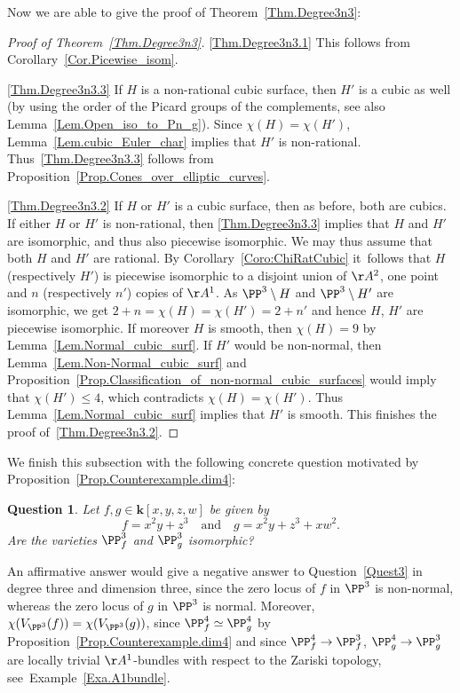 \documentclass[JEP,XML,SOM,Unicode,NoFloatCountersInSection,published]{cedram}
\newcommand\quand{\quad\text{and}\quad}
\newtheorem{question}[lemma]{Question}
\theoremstyle{definition}
\renewcommand\k{{\mathbf k}}
\begin{document}
Now we are able to give the proof of Theorem~\ref{Thm.Degree3n3}:

\skpt
\begin{proof}[Proof of Theorem~\ref{Thm.Degree3n3}]
\eqref{Thm.Degree3n3.1} This follows from Corollary~\ref{Cor.Picewise_isom}.

\eqref{Thm.Degree3n3.3} If $H$ is a non-rational cubic surface,
then $H'$ is a cubic as well (by using the order of the Picard groups
of the complements, see also Lemma~\ref{Lem.Open_iso_to_Pn_g}).
Since $\chi(H) = \chi(H')$, Lemma~\ref{Lem.cubic_Euler_char} implies that $H'$ is non-rational.
Thus~\ref{Thm.Degree3n3.3} follows from Proposition~\ref{Prop.Cones_over_elliptic_curves}.

\eqref{Thm.Degree3n3.2}
If $H$ or $H'$ is a cubic surface, then as before, both are cubics.
If either $H$ or $H'$ is non-rational, then \ref{Thm.Degree3n3.3} implies that $H$ and $H'$ are isomorphic, and thus also piecewise isomorphic. We may thus assume that both $H$ and $H'$ are rational. By Corollary~\ref{Coro:ChiRatCubic}
it~follows that $H$ (respectively $H'$) is piecewise isomorphic to a disjoint union of $\AA^2$, one point and
$n$ (respectively $n'$) copies of $\AA^1$. As $\PP^3 \setminus H$ and $\PP^3 \setminus H'$
are isomorphic, we get $2 + n = \chi(H) = \chi(H') = 2 + n'$ and hence $H$, $H'$ are piecewise isomorphic.
If moreover $H$ is smooth, then $\chi(H) = 9$ by Lemma~\ref{Lem.Normal_cubic_surf}.
If $H'$ would be non-normal, then Lemma~\ref{Lem.Non-Normal_cubic_surf} and Proposition~\ref{Prop.Classification_of_non-normal_cubic_surfaces} would imply that $\chi(H') \leq 4$,
which contradicts $\chi(H) = \chi(H')$. Thus Lemma~\ref{Lem.Normal_cubic_surf} implies that $H'$
is smooth. This finishes the proof of~\ref{Thm.Degree3n3.2}.
\end{proof}

We finish this subsection with the following concrete question motivated by Proposition~\ref{Prop.Counterexample.dim4}:

\begin{question}
Let $f, g \in \k[x, y, z, w]$ be given by
\[
f = x^2 y + z^3 \quand g = x^2 y + z^3 + x w^2.
\]
Are the varieties $\PP^3_f$ and $\PP^3_g$ isomorphic?
\end{question}

An affirmative answer would give a negative answer to Question~\eqref{Quest3}
in degree three and dimension three,
since the zero locus of $f$ in $\PP^3$ is non-normal, whereas the zero locus of $g$ in $\PP^3$ is normal.
Moreover, $\chi(V_{\PP^3}(f)) = \chi(V_{\PP^3}(g))$, since $\PP^4_f \simeq \PP^4_g$ by Proposition~\ref{Prop.Counterexample.dim4} and since
$\PP^4_f \to \PP^3_f$, $\PP^4_g \to \PP^3_g$ are locally trivial $\AA^1$-bundles with respect to the Zariski topology,
see~Example~\ref{Exa.A1bundle}.
\end{document}

